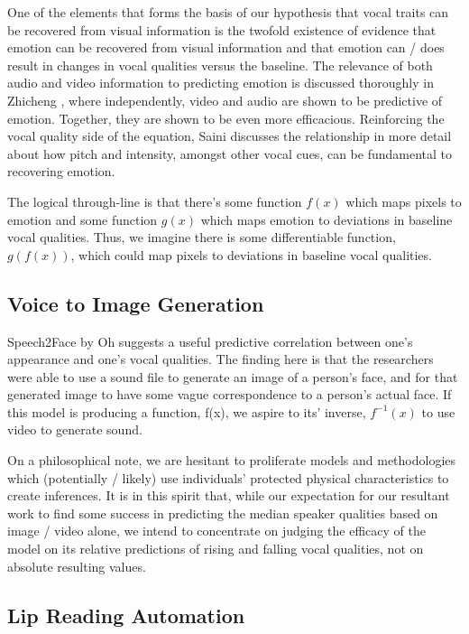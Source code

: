 \documentclass[10pt,twocolumn,letterpaper]{article}
\begin{document}
One of the elements that forms the basis of our hypothesis that vocal traits can be recovered from visual information is the twofold existence of evidence that emotion can be recovered from visual information and that emotion can / does result in changes in vocal qualities versus the baseline. The relevance of both audio and video information to predicting emotion is discussed thoroughly in Zhicheng  \cite{EmotVid2023}, where independently, video and audio are shown to be predictive of emotion. Together, they are shown to be even more efficacious. Reinforcing the vocal quality side of the equation, Saini \cite{EmotPitch2023} discusses the relationship in more detail about how pitch and intensity, amongst other vocal cues, can be fundamental to recovering emotion.

The logical through-line is that there's some function \(f(x)\) which maps pixels to emotion and some function \(g(x)\) which maps emotion to deviations in baseline vocal qualities. Thus, we imagine there is some differentiable function, \(g(f(x))\), which could map pixels to deviations in baseline vocal qualities.

\subsection{Voice to Image Generation}

Speech2Face by Oh \cite{Speech2face} suggests a useful predictive correlation between one's appearance and one's vocal qualities. The finding here is that the researchers were able to use a sound file to generate an image of a person's face, and for that generated image to have some vague correspondence to a person's actual face. If this model is producing a function, f(x), we aspire to its' inverse, \(f^{-1} (x)\) to use video to generate sound.

On a philosophical note, we are hesitant to proliferate models and methodologies which (potentially / likely) use individuals' protected physical characteristics to create inferences. It is in this spirit that, while our expectation for our resultant work to find some success in predicting the median speaker qualities based on image / video alone, we intend to concentrate on judging the efficacy of the model on its relative predictions of rising and falling vocal qualities, not on absolute resulting values.

\subsection{Lip Reading Automation}
\end{document}
